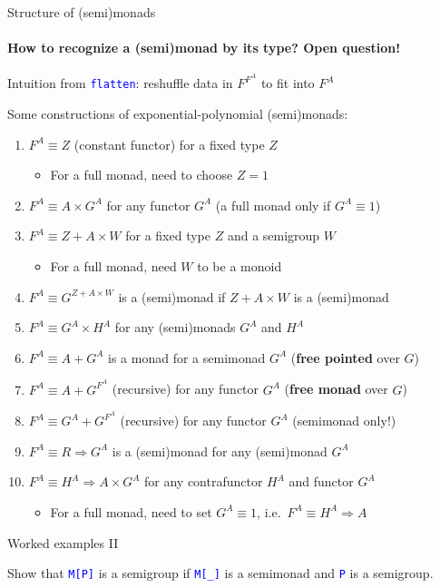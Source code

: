 \documentclass[english]{beamer}
\begin{document}
\begin{frame}{Structure of (semi)monads}


\framesubtitle{How to recognize a (semi)monad by its type? Open question!}

Intuition from \texttt{\textcolor{blue}{\footnotesize{}flatten}}:
reshuffle data in $F^{F^{A}}$ to fit into $F^{A}$

Some constructions of exponential-polynomial (semi)monads:
\begin{enumerate}
\item $F^{A}\equiv Z$ (constant functor) for a fixed type $Z$
\begin{itemize}
\item For a full monad, need to choose $Z=1$ 
\end{itemize}
\item $F^{A}\equiv A\times G^{A}$ for any functor $G^{A}$ (a full monad
only if $G^{A}\equiv1$)
\item $F^{A}\equiv Z+A\times W$ for a fixed type $Z$ and a semigroup $W$
\begin{itemize}
\item For a full monad, need $W$ to be a monoid
\end{itemize}
\item $F^{A}\equiv G^{Z+A\times W}$ is a (semi)monad if $Z+A\times W$
is a (semi)monad
\item $F^{A}\equiv G^{A}\times H^{A}$ for any (semi)monads $G^{A}$ and
$H^{A}$
\item $F^{A}\equiv A+G^{A}$ is a monad for a semimonad $G^{A}$ (\textbf{free
pointed} over $G$)
\item $F^{A}\equiv A+G^{F^{A}}$ (recursive) for any functor $G^{A}$ (\textbf{free
monad} over $G$)
\item $F^{A}\equiv G^{A}+G^{F^{A}}$ (recursive) for any functor $G^{A}$
(semimonad only!)
\item $F^{A}\equiv R\Rightarrow G^{A}$ is a (semi)monad for any (semi)monad
$G^{A}$
\item $F^{A}\equiv H^{A}\Rightarrow A\times G^{A}$ for any contrafunctor
$H^{A}$ and functor $G^{A}$
\begin{itemize}
\item For a full monad, need to set $G^{A}\equiv1$, i.e.\ $F^{A}\equiv H^{A}\Rightarrow A$
\end{itemize}
\end{enumerate}
\end{frame}

\begin{frame}{Worked examples II}

Show that \texttt{\textcolor{blue}{\footnotesize{}M{[}P{]}}} is a
semigroup if \texttt{\textcolor{blue}{\footnotesize{}M{[}\_{]}}} is
a semimonad and \texttt{\textcolor{blue}{\footnotesize{}P}} is a semigroup.
\end{frame}
\end{document}
